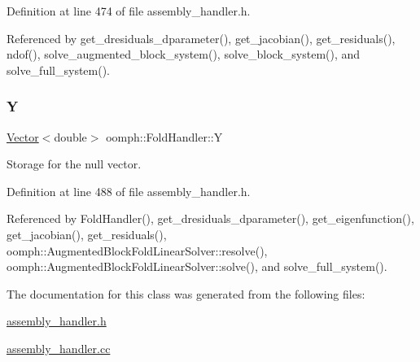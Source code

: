 Definition at line 474 of file assembly\+\_\+handler.\+h.



Referenced by get\+\_\+dresiduals\+\_\+dparameter(), get\+\_\+jacobian(), get\+\_\+residuals(), ndof(), solve\+\_\+augmented\+\_\+block\+\_\+system(), solve\+\_\+block\+\_\+system(), and solve\+\_\+full\+\_\+system().

\mbox{\label{classoomph_1_1FoldHandler_ac8697e5d9484fc0488d4c16b822c792e}} 
\subsubsection{\texorpdfstring{Y}{Y}}
{\footnotesize\ttfamily \hyperlink{classoomph_1_1Vector}{Vector}$<$double$>$ oomph\+::\+Fold\+Handler\+::Y\hspace{0.3cm}{\ttfamily [private]}}



Storage for the null vector. 



Definition at line 488 of file assembly\+\_\+handler.\+h.



Referenced by Fold\+Handler(), get\+\_\+dresiduals\+\_\+dparameter(), get\+\_\+eigenfunction(), get\+\_\+jacobian(), get\+\_\+residuals(), oomph\+::\+Augmented\+Block\+Fold\+Linear\+Solver\+::resolve(), oomph\+::\+Augmented\+Block\+Fold\+Linear\+Solver\+::solve(), and solve\+\_\+full\+\_\+system().



The documentation for this class was generated from the following files\+:\begin{DoxyCompactItemize}
\item 
\hyperlink{assembly__handler_8h}{assembly\+\_\+handler.\+h}\item 
\hyperlink{assembly__handler_8cc}{assembly\+\_\+handler.\+cc}\end{DoxyCompactItemize}
